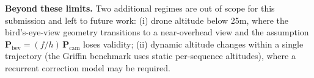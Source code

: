 \documentclass[9.5pt,twocolumn,a4paper]{IEEEtran}
\def\mb#1{\mathbf{#1}}
\begin{document}
\noindent\textbf{Beyond these limits.} Two additional regimes are out of scope for this submission and left to future work: (i) drone altitude below 25m, where the bird's-eye-view geometry transitions to a near-overhead view and the assumption $\mb{P}_{\text{bev}} = (f/h)\,\mb{P}_{\text{cam}}$ loses validity; (ii) dynamic altitude changes within a single trajectory (the Griffin benchmark uses static per-sequence altitudes), where a recurrent correction model may be required.
\end{document}
